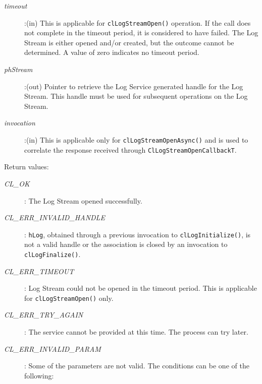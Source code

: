 \begin{flushleft}
\begin{Desc}
\begin{description}
\item[{\em timeout}]:(in) This is applicable for {\tt{clLogStreamOpen()}} operation. If the call does not complete in the timeout period, it is 
considered to have failed. The Log Stream is either opened and/or created, but the outcome cannot be determined. A value of zero indicates
no timeout period.

\item[{\em phStream}]:(out) Pointer to retrieve the Log Service generated handle for the Log Stream. This handle must be used for subsequent operations on 
the Log Stream.

\item[{\em invocation}]:(in) This is applicable only for {\tt{clLogStreamOpenAsync()}} and is used to correlate the response received through 
{\tt{ClLogStreamOpenCallbackT}}.

\end{description}
\end{Desc}

\begin{Desc}



\item[Return values:]
\begin{description}

\item[{\em CL\_\-OK}]: The Log Stream opened successfully.

\item[{\em CL\_\-ERR\_\-INVALID\_\-HANDLE}]: {\tt{hLog}}, obtained through a previous invocation to 
{\tt{clLogInitialize()}}, is not a valid handle or the association is closed by an invocation to {\tt{clLogFinalize()}}.

\item[{\em CL\_\-ERR\_\-TIMEOUT}]: Log Stream could not be opened in the timeout period. This is applicable for {\tt{clLogStreamOpen()}} only.

\item[{\em CL\_\-ERR\_\-TRY\_\-AGAIN}]: The service cannot be provided at this time. The process can try later.

\item[{\em CL\_\-ERR\_\-INVALID\_\-PARAM}]: Some of the parameters are not valid. The conditions can be one of the following:


\end{description}
\end{Desc}
\end{flushleft}
